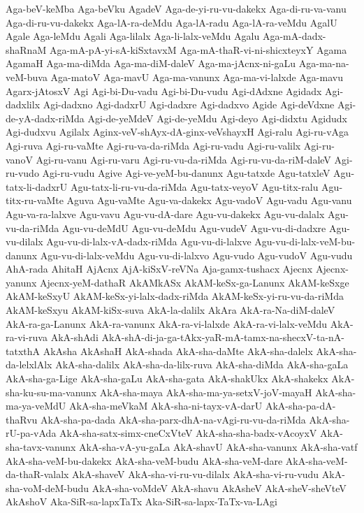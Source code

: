 {Aga-beV-keMba
Aga-beVku
AgadeV
Aga-de-yi-ru-vu-dakekx
Aga-di-ru-va-vanu
Aga-di-ru-vu-dakekx
Aga-lA-ra-deMdu
Aga-lA-radu
Aga-lA-ra-veMdu
AgalU
Agale
Aga-leMdu
Agali
Aga-lilalx
Aga-li-lalx-veMdu
Agalu
Aga-mA-dadx-shaRnaM
Aga-mA-pA-yi-sA-kiSxtavxM
Aga-mA-thaR-vi-ni-shicxteyxY
Agama
AgamaH
Aga-ma-diMda
Aga-ma-diM-daleV
Aga-ma-jAcnx-ni-gaLu
Aga-ma-na-veM-buva
Aga-matoV
Aga-mavU
Aga-ma-vanunx
Aga-ma-vi-lalxde
Aga-mavu
Agarx-jAtosxV
Agi
Agi-bi-Du-vadu
Agi-bi-Du-vudu
Agi-dAdxne
Agidadx
Agi-dadxlilx
Agi-dadxno
Agi-dadxrU
Agi-dadxre
Agi-dadxvo
Agide
Agi-deVdxne
Agi-de-yA-dadx-riMda
Agi-de-yeMdeV
Agi-de-yeMdu
Agi-deyo
Agi-didxtu
Agidudx
Agi-dudxvu
Agilalx
Aginx-veV-shAyx-dA-ginx-veVshayxH
Agi-ralu
Agi-ru-vAga
Agi-ruva
Agi-ru-vaMte
Agi-ru-va-da-riMda
Agi-ru-vadu
Agi-ru-valilx
Agi-ru-vanoV
Agi-ru-vanu
Agi-ru-varu
Agi-ru-vu-da-riMda
Agi-ru-vu-da-riM-daleV
Agi-ru-vudo
Agi-ru-vudu
Agive
Agi-ve-yeM-bu-danunx
Agu-tatxde
Agu-tatxleV
Agu-tatx-li-dadxrU
Agu-tatx-li-ru-vu-da-riMda
Agu-tatx-veyoV
Agu-titx-ralu
Agu-titx-ru-vaMte
Aguva
Agu-vaMte
Agu-va-dakekx
Agu-vadoV
Agu-vadu
Agu-vanu
Agu-va-ra-lalxve
Agu-vavu
Agu-vu-dA-dare
Agu-vu-dakekx
Agu-vu-dalalx
Agu-vu-da-riMda
Agu-vu-deMdU
Agu-vu-deMdu
Agu-vudeV
Agu-vu-di-dadxre
Agu-vu-dilalx
Agu-vu-di-lalx-vA-dadx-riMda
Agu-vu-di-lalxve
Agu-vu-di-lalx-veM-bu-danunx
Agu-vu-di-lalx-veMdu
Agu-vu-di-lalxvo
Agu-vudo
Agu-vudoV
Agu-vudu
AhA-rada
AhitaH
AjAcnx
AjA-kiSxV-reVNa
Aja-gamx-tushacx
Ajecnx
Ajecnx-yanunx
Ajecnx-yeM-dathaR
AkAMkASx
AkAM-keSx-ga-Lanunx
AkAM-keSxge
AkAM-keSxyU
AkAM-keSx-yi-lalx-dadx-riMda
AkAM-keSx-yi-ru-vu-da-riMda
AkAM-keSxyu
AkAM-kiSx-suva
AkA-la-dalilx
AkAra
AkA-ra-Na-diM-daleV
AkA-ra-ga-Lanunx
AkA-ra-vanunx
AkA-ra-vi-lalxde
AkA-ra-vi-lalx-veMdu
AkA-ra-vi-ruva
AkA-shAdi
AkA-shA-di-ja-ga-tAkx-yaR-mA-tamx-na-shecxV-ta-nA-tatxthA
AkAsha
AkAshaH
AkA-shada
AkA-sha-daMte
AkA-sha-dalelx
AkA-sha-da-lelxlAlx
AkA-sha-dalilx
AkA-sha-da-lilx-ruva
AkA-sha-diMda
AkA-sha-gaLa
AkA-sha-ga-Lige
AkA-sha-gaLu
AkA-sha-gata
AkA-shakUkx
AkA-shakekx
AkA-sha-ku-su-ma-vanunx
AkA-sha-maya
AkA-sha-ma-ya-setxV-joV-mayaH
AkA-sha-ma-ya-veMdU
AkA-sha-meVkaM
AkA-sha-ni-tayx-vA-darU
AkA-sha-pa-dA-thaRvu
AkA-sha-pa-dada
AkA-sha-parx-dhA-na-vAgi-ru-vu-da-riMda
AkA-sha-rU-pa-vAda
AkA-sha-satx-simx-cneCxVteV
AkA-sha-sha-badx-vAcoyxV
AkA-sha-tavx-vanunx
AkA-sha-vA-yu-gaLa
AkA-shavU
AkA-sha-vanunx
AkA-sha-vatf
AkA-sha-veM-bu-dakekx
AkA-sha-veM-budu
AkA-sha-veM-dare
AkA-sha-veM-da-thaR-valalx
AkA-shaveV
AkA-sha-vi-ru-vu-dilalx
AkA-sha-vi-ru-vudu
AkA-sha-voM-deM-budu
AkA-sha-voMdeV
AkA-shavu
AkAsheV
AkA-sheV-sheVteV
AkAshoV
Aka-SiR-sa-lapxTaTx
Aka-SiR-sa-lapx-TaTx-va-LAgi
}
